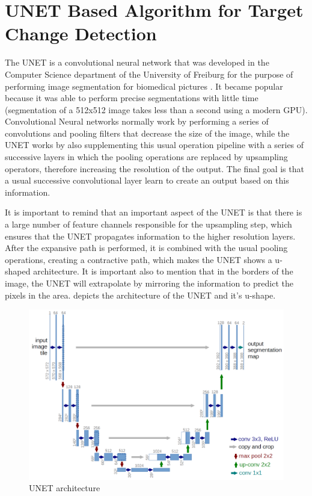 \section{UNET Based Algorithm for Target Change Detection}
The UNET is a convolutional neural network that was developed in the Computer Science department of the University of Freiburg for the purpose of performing image segmentation for
biomedical pictures \cite{Unet}. It became popular because it was able to perform precise segmentations with little time (segmentation of a 512x512 image takes less than a second using a modern GPU).
Convolutional Neural networks normally work by performing a series of convolutions and pooling filters that decrease the size of the image, while the UNET works by also 
supplementing this usual operation pipeline with a series of successive layers in which the pooling operations are replaced by upsampling operators, therefore increasing the resolution of the output.
The final goal is that a usual successive convolutional layer learn to create an output based on this information. 

It is important to remind that an important aspect of the UNET is that there is a large number of feature channels responsible for the upsampling step, which ensures that the UNET propagates information
to the higher resolution layers. After the expansive path is performed, it is combined with the usual pooling operations, creating a contractive path, which makes the UNET shows a u-shaped architecture. 
It is important also to mention that in the borders of the image, the UNET will extrapolate by mirroring the information to predict the pixels in the area. 
 depicts the architecture of the UNET and it's u-shape.

\begin{figure}[ht]
    \centering
    \includegraphics[width=0.7\linewidth]{Chapter7/unet_architecture.png}
    \caption{UNET architecture}
    \label{fig:unet_architecture}
\end{figure}

